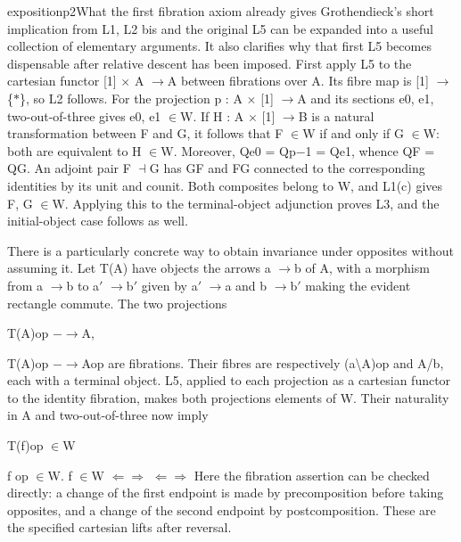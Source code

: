 \begin{dcomment}{exposition}{p2}{What the first fibration axiom already gives}
Grothendieck’s short implication from L1, L2 bis and the original L5 can be expanded into a useful collection of elementary arguments. It also clarifies why that first L5 becomes dispensable after relative descent has been imposed. First apply L5 to the cartesian functor [1] \ensuremath{\times} A \ensuremath{\to}A between fibrations over A. Its fibre map is [1] \ensuremath{\to}\{\ensuremath{*}\}, so L2 follows. For the projection p : A \ensuremath{\times} [1] \ensuremath{\to}A and its sections e0, e1, two-out-of-three gives e0, e1 \ensuremath{\in}W. If H : A \ensuremath{\times} [1] \ensuremath{\to}B is a natural transformation between F and G, it follows that F \ensuremath{\in}W if and only if G \ensuremath{\in}W: both are equivalent to H \ensuremath{\in}W. Moreover, Qe0 = Qp\ensuremath{-}1 = Qe1, whence QF = QG. An adjoint pair F \ensuremath{\dashv}G has GF and FG connected to the corresponding identities by its unit and counit. Both composites belong to W, and L1(c) gives F, G \ensuremath{\in}W. Applying this to the terminal-object adjunction proves L3, and the initial-object case follows as well.

There is a particularly concrete way to obtain invariance under opposites without assuming it. Let T(A) have objects the arrows a \ensuremath{\to}b of A, with a morphism from a \ensuremath{\to}b to a\ensuremath{\prime} \ensuremath{\to}b\ensuremath{\prime} given by a\ensuremath{\prime} \ensuremath{\to}a and b \ensuremath{\to}b\ensuremath{\prime} making the evident rectangle commute. The two projections

T(A)op \ensuremath{-}\ensuremath{\to}A,

T(A)op \ensuremath{-}\ensuremath{\to}Aop are fibrations. Their fibres are respectively (a\textbackslash{}A)op and A/b, each with a terminal object. L5, applied to each projection as a cartesian functor to the identity fibration, makes both projections elements of W. Their naturality in A and two-out-of-three now imply

T(f)op \ensuremath{\in}W

f op \ensuremath{\in}W. f \ensuremath{\in}W \ensuremath{\Leftarrow}\ensuremath{\Rightarrow} \ensuremath{\Leftarrow}\ensuremath{\Rightarrow} Here the fibration assertion can be checked directly: a change of the first endpoint is made by precomposition before taking opposites, and a change of the second endpoint by postcomposition. These are the specified cartesian lifts after reversal.


\end{dcomment}
